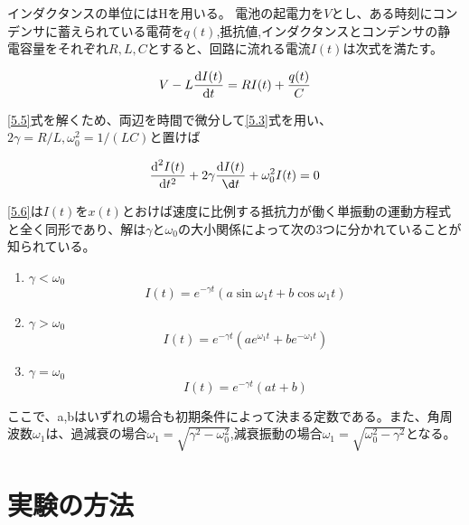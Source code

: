 \documentclass{jsarticle}
\begin{document}
インダクタンスの単位にはHを用いる。
電池の起電力を$V$とし、ある時刻にコンデンサに蓄えられている電荷を$q(t)$,抵抗値,インダクタンスとコンデンサの静電容量をそれぞれ$R,L,C$とすると、回路に流れる電流$I(t)$は次式を満たす。

\begin{equation}
\label{5.5}
    V-L\frac{\textrm{d}I(t)}{\textrm d t} = RI(t) + \frac{q(t)}{C}
\end{equation}

\ref{5.5}式を解くため、両辺を時間で微分して\ref{5.3}式を用い、$2\gamma = R/L, \omega_0^2 = 1/(LC)$と置けば

\begin{equation}
\label{5.6}
    \frac{\textrm d ^2 I(t)}{\textrm d t^2} + 2\gamma\frac{\textrm d I(t)}{\d t} + \omega_0^2 I(t) = 0
\end{equation}

\ref{5.6}は$I(t)$を$x(t)$とおけば速度に比例する抵抗力が働く単振動の運動方程式と全く同形であり、解は$\gamma$と$\omega_0$の大小関係によって次の3つに分かれていることが知られている。

\begin{enumerate}
    \item $\gamma<\omega_0$
    \begin{equation}
        \label{5.7}
        I(t) = e^{-\gamma t}(a\sin \omega_1 t + b\cos \omega_1 t)
    \end{equation}
       
    \item $\gamma>\omega_0$
    \begin{equation}
        \label{5.8}
        I(t) = e^{-\gamma t}(ae^{\omega_1 t} + be^{-\omega_1 t})
    \end{equation}
    
    \item $\gamma = \omega_0$
    \begin{equation}
        \label{5.9}
        I(t) = e^{-\gamma t}(at + b)
    \end{equation}
\end{enumerate}

ここで、a,bはいずれの場合も初期条件によって決まる定数である。また、角周波数$\omega_1$は、過減衰の場合$\omega_1 = \sqrt{\gamma^2 - \omega_0^2}$,減衰振動の場合$\omega_1 = \sqrt{\omega_0^2 - \gamma^2}$となる。



\section{実験の方法}
    
\end{document}
